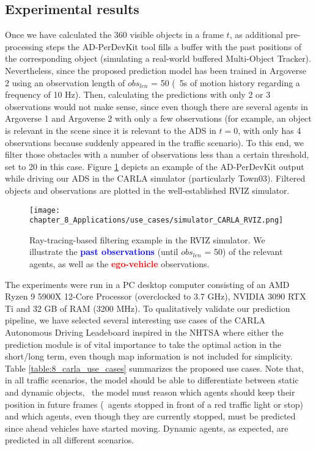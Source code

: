 \subsection{Experimental results}
\label{subsec:8_experimental_results}

Once we have calculated the 360 \degree visible objects in a frame $t$, as additional pre-processing steps the \ac{AD-PerDevKit} tool fills a buffer with the past positions of the corresponding object (simulating a real-world buffered Multi-Object Tracker). Nevertheless, since the proposed prediction model has been trained in Argoverse 2 using an observation length of \textit{$obs_{len}$} = 50 (\ie \ 5s of motion history regarding a frequency of 10 Hz). Then, calculating the predictions with only 2 or 3 observations would not make sense, since even though there are several agents in Argoverse 1 and Argoverse 2 with only a few observations (for example, an object is relevant in the scene since it is relevant to the \ac{ADS} in $t=0$, with only has 4 observations because suddenly appeared in the traffic scenario). To this end, we filter those obstacles with a number of observations less than a certain threshold, set to 20 in this case. Figure \ref{fig:chapter_8_Applications/use_cases/simulator_CARLA_RVIZ} depicts an example of the \ac{AD-PerDevKit} output while driving our \ac{ADS} in the \ac{CARLA} simulator (particularly Town03). Filtered objects and observations are plotted in the well-established RVIZ simulator. 

\begin{figure}[!h]
	\centering
	\texttt{[image: chapter\_8\_Applications/use\_cases/simulator\_CARLA\_RVIZ.png]}
	\captionsetup{justification=justified}
	\caption[Ray-tracing-based filtering example in the \ac{RVIZ} simulator]{Ray-tracing-based filtering example in the \ac{RVIZ} simulator. We illustrate the \textbf{\textcolor{blue}{past observations}} (until \textit{$obs_{len}$} = 50) of the relevant agents, as well as the \textbf{\textcolor{red}{ego-vehicle}} observations.}
	\label{fig:chapter_8_Applications/use_cases/simulator_CARLA_RVIZ}
\end{figure}

The experiments were run in a PC desktop computer consisting of an AMD Ryzen 9 5900X 12-Core Processor (overclocked to 3.7 GHz), NVIDIA 3090 RTX Ti and 32 GB of RAM (3200 MHz). To qualitatively validate our prediction pipeline, we have selected several interesting use cases of the \ac{CARLA} Autonomous Driving Leadeboard inspired in the \ac{NHTSA} where either the prediction module is of vital importance to take the optimal action in the short/long term, even though map information is not included for simplicity. Table \ref{table:8_carla_use_cases} summarizes the proposed use cases. Note that, in all traffic scenarios, the model should be able to differentiate between static and dynamic objects, \ie \ the model must reason which agents should keep their position in future frames (\eg \ agents stopped in front of a red traffic light or stop) and which agents, even though they are currently stopped, must be predicted since ahead vehicles have started moving. Dynamic agents, as expected, are predicted in all different scenarios. 

